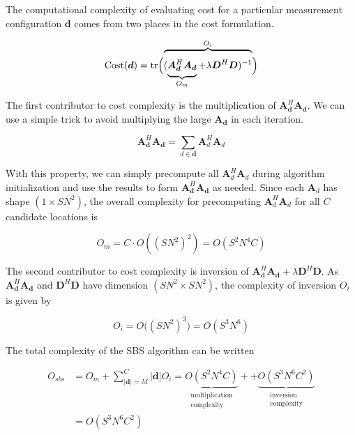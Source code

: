 \documentclass{article}
\begin{document}
The computational complexity of evaluating cost for a particular measurement
configuration $\bm{d}$ comes from two places in the cost formulation.

$$
  \text{Cost}(\bm{d}) = \text{tr} \Bigl(
  \overbrace{\vphantom{\rule[1.5em]{0pt}{0pt}}
(\underbrace{\vphantom{\rule[-0.5em]{0pt}{0pt}} \bm{A}_{\bm{d}}^H \bm{A}_{\bm{d}}}_{O_m}
+\lambda \bm{D}^H\bm{D})^{-1}
}^{O_i}
\Bigr)
$$

The first contributor to cost complexity is the multiplication of
$\bm{A}^H_{\bm{d}}\bm{A}_{\bm{d}}$.  We can use a simple trick to avoid
multiplying the large $\bm{A}_{\bm{d}}$ in each iteration.

$$
\bm{A}^H_{\bm{d}} \bm{A}_{\bm{d}} = \sum_{d \in \bm{d}} \bm{A}^H_{d} \bm{A}_{d}
$$

With this property, we can simply precompute all $\bm{A}^H_{d}\bm{A}_{d}$ during
algorithm initialization and use the results to form
$\bm{A}^H_{\bm{d}}\bm{A}_{\bm{d}}$ as needed.
Since each $\bm{A}_d$ has shape $(1 \times SN^2)$, the overall complexity for precomputing $\bm{A}^H_d \bm{A}_d$ for all $C$ candidate locations is

$$
O_m = C \cdot O((SN^2)^2) = O(S^2N^4C)
$$

The second contributor to cost complexity is inversion of $\bm{A}^H_{\bm{d}}
\bm{A}_{\bm{d}} + \lambda\bm{D}^H \bm{D}$.
As $\bm{A}^H_{\bm{d}} \bm{A}_{\bm{d}}$ and $\bm{D}^H \bm{D}$ have dimension $(SN^2
\times SN^2)$, the complexity of inversion $O_i$ is given by

$$O_i = O\big( (SN^2)^3 \big) = O(S^3N^6)$$

The total complexity of the SBS algorithm can be written

\begin{align*}
  O_{sbs} &= O_m + \sum_{|\bm{d}| = M}^C |\bm{d}| O_i =
  \underbrace{
  O(S^2N^4C)
  }_{\substack{\text{multiplication}\\ \text{complexity}}} +
  +
  \underbrace{
  O(S^3N^6C^2)
  }_{\substack{\text{inversion}\\ \text{complexity}}} \\
  &= O(S^3N^6C^2)
\end{align*}

\end{document}
